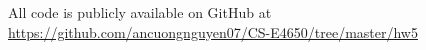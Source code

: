 All code is publicly available on GitHub at \url{https://github.com/ancuongnguyen07/CS-E4650/tree/master/hw5}